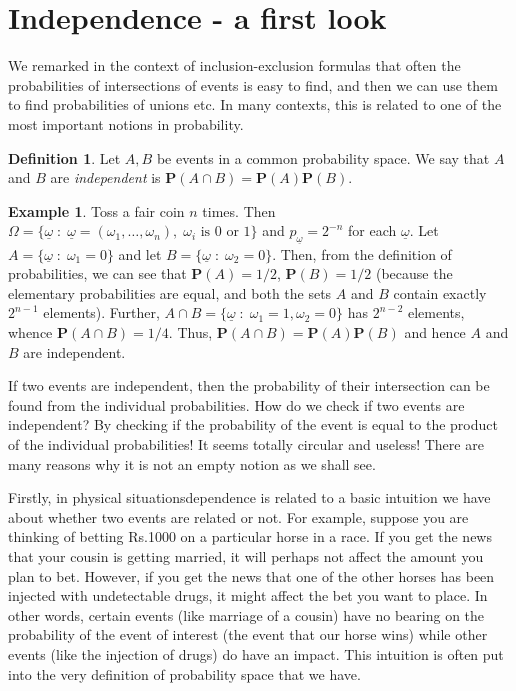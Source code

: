 \documentclass[preprint,  11pt]{amsart}
\theoremstyle{plain} %
\theoremstyle{definition} %
\newtheorem{definition}[theorem]{Definition}
\newtheorem{example}[theorem]{Example}
\begin{document}
\section{Independence - a first look}
We remarked in the context of inclusion-exclusion formulas that often the probabilities of intersections of events is easy to find, and then we can use them to find probabilities of unions etc. In many contexts, this is related to one of the most important notions in probability.

\begin{definition} Let $A,B$ be events in a common probability space. We say that $A$ and $B$ are {\em independent} is $\mathbf{P}(A\cap B)=\mathbf{P}(A)\mathbf{P}(B)$.
\end{definition}
\begin{example} Toss a fair coin $n$ times. Then $\Omega=\{\underline{\omega}{\; : \;} \underline{\omega}=(\omega_{1},\ldots ,\omega_{n}), \; \omega_{i}\mbox{ is }0\mbox{ or }1\}$ and $p_{\underline{\omega}}=2^{-n}$ for each $\underline{\omega}$. Let $A=\{\underline{\omega}{\; : \;} \omega_{1}=0\}$ and let $B=\{\underline{\omega}{\; : \;} \omega_{2}=0\}$. Then, from the definition of probabilities, we can see that $\mathbf{P}(A)=1/2$, $\mathbf{P}(B)=1/2$ (because the elementary probabilities are equal, and both the sets $A$ and $B$ contain exactly $2^{n-1}$ elements). Further, $A\cap B=\{\underline{\omega}{\; : \;} \omega_{1}=1, \omega_{2}=0\}$ has $2^{n-2}$ elements, whence $\mathbf{P}(A\cap B)=1/4$. Thus, $\mathbf{P}(A\cap B)=\mathbf{P}(A)\mathbf{P}(B)$ and hence $A$ and $B$ are independent. 
\end{example}
If two events are independent, then the probability of their intersection can be found from the individual probabilities. How do we check if two events are independent? By checking if the probability of the event is equal to the product of the individual probabilities! It seems totally circular and useless! There are many reasons why it is not an empty notion as we shall see. 

Firstly, in physical situationsdependence is related to a basic intuition we have about whether two events are related or not. For example, suppose you are thinking of betting Rs.1000 on a particular horse in a race. If you get the news that your cousin is getting married, it will perhaps not affect the amount you plan to bet. However, if you get the news that one of the other horses has been injected with undetectable drugs, it might affect the bet you want to place. In other words, certain events (like marriage of a cousin) have no bearing on the probability of the event of interest (the event that our horse wins) while other events (like the injection of drugs) do have an impact. This intuition is often put into the very definition of probability space that we have. 
\end{document}
